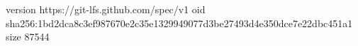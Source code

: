version https://git-lfs.github.com/spec/v1
oid sha256:1bd2dca8c3ef987670e2c35e1329949077d3be27493d4e350dce7e22dbc451a1
size 87544
